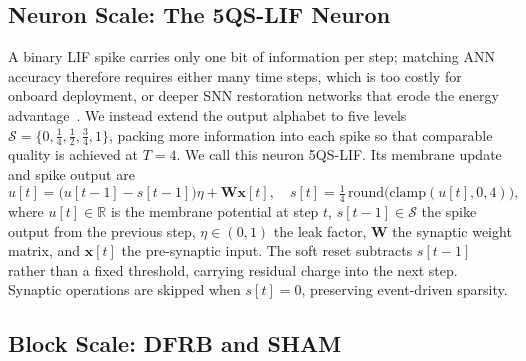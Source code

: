 \documentclass[conference]{IEEEtran}
\newcommand{\FQS}{5QS}
\begin{document}
\subsection{Neuron Scale: The \FQS-LIF{} Neuron}
\label{sec:framework-neuron}

A binary LIF spike carries only one bit of information per step;
matching ANN accuracy therefore requires either many time steps,
which is too costly for onboard deployment, or deeper SNN restoration
networks that erode the energy advantage~\cite{ref:esdnet}. We
instead extend the output alphabet to five levels
$\mathcal{S} = \{0,\tfrac{1}{4},\tfrac{1}{2},\tfrac{3}{4},1\}$,
packing more information into each spike so that comparable quality
is achieved at $T\!=\!4$. We call this neuron \FQS-LIF{}. Its
membrane update and spike output are
\begin{equation}
    u[t] = \bigl(u[t{-}1] - s[t{-}1]\bigr)\eta + \mathbf{W}\mathbf{x}[t], \quad
    s[t] = \tfrac{1}{4}\,\mathrm{round}\!\bigl(\mathrm{clamp}(u[t],0,4)\bigr),
    \label{eq:5qs}
\end{equation}
where $u[t]\in\mathbb{R}$ is the membrane potential at step $t$,
$s[t{-}1]\in\mathcal{S}$ the spike output from the previous step,
$\eta\in(0,1)$ the leak factor, $\mathbf{W}$ the synaptic weight
matrix, and $\mathbf{x}[t]$ the pre-synaptic input. The soft reset
subtracts $s[t{-}1]$ rather than a fixed threshold, carrying residual
charge into the next step. Synaptic operations are skipped when
$s[t]\!=\!0$, preserving event-driven sparsity.

\subsection{Block Scale: DFRB and SHAM}
\label{sec:framework-block}
\end{document}
